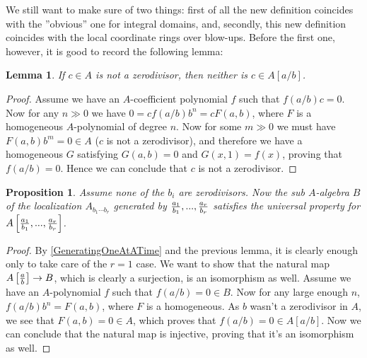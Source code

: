 \documentclass[12pt,a4paper,leqno]{article}
\newcommand{\fref}[1]{\hyperref[{#1}]{\ref*{#1}}}
\theoremstyle{plain}
\newtheorem{lem}[theo]{Lemma}
\newtheorem{prop}[theo]{Proposition}
\theoremstyle{definition}
\theoremstyle{remark}
\begin{document}
We still want to make sure of two things: first of all the new definition coincides with the ''obvious'' one for integral domains, and, secondly, this new definition coincides with the local coordinate rings over blow-ups. Before the first one, however, it is good to record the following lemma:

\begin{lem}
If $c \in A$ is not a zerodivisor, then neither is $c \in A [a/b]$.
\end{lem}
\begin{proof}
Assume we have an $A$-coefficient polynomial $f$ such that $f(a/b) c = 0$. Now  for any $n \gg 0$ we have $0 = cf (a/b) b^n = c F(a,b)$, where $F$ is a homogeneous $A$-polynomial of degree $n$. Now for some $m \gg 0$ we must have $F(a,b) b^m = 0 \in A$ ($c$ is not a zerodivisor), and therefore we have a homogeneous $G$ satisfying $G(a,b) = 0$ and $G(x,1) = f(x)$, proving that $f(a/b) = 0$. Hence we can conclude that $c$ is not a zerodivisor.
\end{proof}

\begin{prop}
Assume none of the $b_i$ are zerodivisors. Now the sub $A$-algebra $B$ of the localization $A_{b_1 \cdots b_r}$ generated by ${a_1 \over b_1},...,{a_r \over b_r}$ satisfies the universal property for $A \left[ {a_1 \over b_1},...,{a_r \over b_r} \right]$.
\end{prop}
\begin{proof}
By \fref{GeneratingOneAtATime} and the previous lemma, it is clearly enough only to take care of the $r = 1$ case. We want to show that the natural map $A \left[ {a \over b} \right] \to B$, which is clearly a surjection, is an isomorphism as well. Assume we have an $A$-polynomial $f$ such that $f(a/b) = 0 \in B$. Now for any large enough $n$, $f(a/b) b^n = F(a,b)$, where $F$ is a homogeneous. As $b$ wasn't a zerodivisor in $A$, we see that $F(a,b) = 0 \in A$, which proves that $f(a/b) = 0 \in A[a/b]$. Now we can conclude that the natural map is injective, proving that it's an isomorphism as well.
\end{proof}
\end{document}
